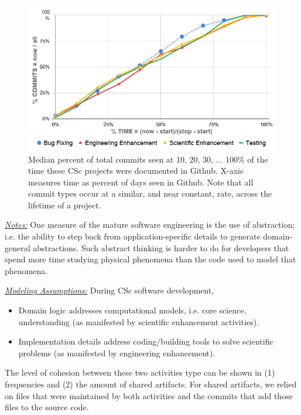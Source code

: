 \documentclass[conference,10pt]{IEEEtran}
\newcommand{\bi}{\begin{itemize}}
\newcommand{\ei}{\end{itemize}}
\begin{document}
\begin{figure}[!t]
\begin{center}\includegraphics[width=0.95\linewidth]{img/commits_belief1.png}\end{center} 
\vspace{-15pt}
\caption{Median percent  of total commits seen
at 10, 20, 30, ... 100\% of 
the time these CSc projects were
documented in Github.
X-axis measures time as percent of days seen in Github.
Note
that all commit types occur
at a similar, and near constant,
 rate, across the lifetime of a project.}\label{fig:belief1} 
\vspace{-5mm} 
\end{figure} 



\noindent \textit{\underline{Notes:}} One measure of the mature software engineering is the
use of abstraction; i.e. the ability to step back from application-specific
details to generate domain-general abstractions. Such abstract thinking is harder to do for developers that spend more time studying physical phenomena than the code used to model that phenomena.


\noindent \textit{\underline{Modeling Assumptions:}} During CSc software development,
\bi
\item Domain logic addresses computational models, i.e. core science, understanding (as manifested by scientific enhancement activities). 
\item Implementation details address coding/building   tools   to solve scientific problems (as manifested by engineering enhancement). 
\ei


The level of cohesion between these two activities type can be shown in (1) frequencies and (2) the amount of shared artifacts. For shared artifacts, we relied on files that were maintained by both activities and the commits that add those files to the source code. 
\end{document}

